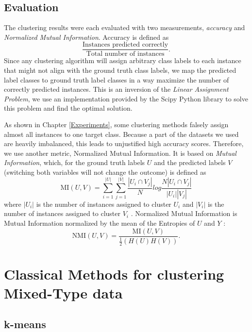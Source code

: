 \subsection{Evaluation} \label{Evaluation}

The clustering results were each evaluated with two measurements, \textit{accuracy} and \textit{Normalized Mutual Information}. Accuracy is defined as 
$$\frac{\text{Instances predicted correctly}}{\text{Total number of instances}}.$$
Since any clustering algorithm will assign arbitrary class labels to each instance that might not align with the ground truth class labels, we map the predicted label classes to ground truth label classes in a way maximize the number of correctly predicted instances. This is an inversion of the \textit{Linear Assignment Problem}, we use an implementation provided by the Scipy Python library \cite{scipy} to solve this problem and find the optimal solution. 

As shown in Chapter \ref{Experiments}, some clustering methods falsely assign almost all instances to one target class. Because a part of the datasets we used are heavily imbalanced, this leads to unjustified high accuracy scores. Therefore, we use another metric, Normalized Mutual Information. It is based on \textit{Mutual Information}, which, for the ground truth labels $U$ and the predicted labels $V$ (switching both variables will not change the outcome) is defined as
$$\text{MI}(U,V) = \sum^{|U|}_{i=1}\sum^{|V|}_{j=1} \frac{|U_i \cap V_j|}{N} log\frac{N|U_i \cap V_j|}{|U_i||V_j|}$$
where $|U_i|$ is the number of instances assigned to cluster $U_i$ and $|V_i|$ is the number of instances assigned to cluster $V_i$ \cite{scikit_learn}. Normalized Mutual Information is Mutual Information normalized by the mean of the Entropies of $U$ and $Y$ \cite{scikit_learn}:
$$\text{NMI}(U,V) = \frac{\text{MI}(U,V)}{\frac{1}{2}(H(U)H(V))}.$$

\section{Classical Methods for clustering Mixed-Type data} \label{Classical Methods for clustering Mixed-Type data}

\subsection{k-means} \label{k-means}

